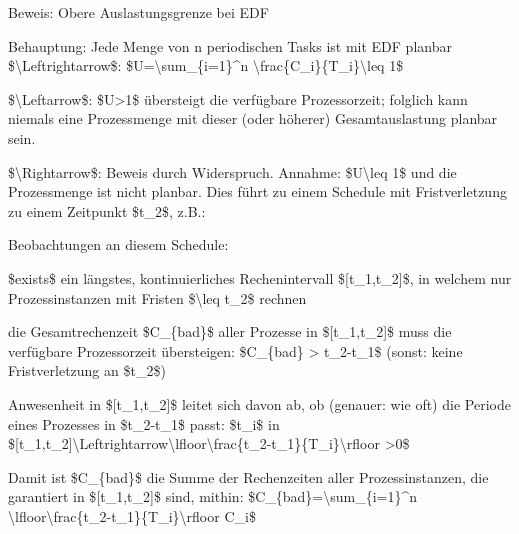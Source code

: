 \documentclass[a4paper]{article}
\begin{document}
\begin{multicols}{3}
\begin{itemize*}
\begin{itemize*}
        \end{itemize*}
        \item Beweis: Obere Auslastungsgrenze bei EDF
        \begin{itemize*}
            \item Behauptung: Jede Menge von n periodischen Tasks ist mit EDF planbar \$\textbackslash Leftrightarrow\$: \$U=\textbackslash sum\_\{i=1\}\^{}n \textbackslash frac\{C\_i\}\{T\_i\}\textbackslash leq 1\$
            \item \$\textbackslash Leftarrow\$: \$U\textgreater1\$ übersteigt die verfügbare Prozessorzeit; folglich kann niemals eine Prozessmenge mit dieser (oder höherer) Gesamtauslastung planbar sein.
            \item \$\textbackslash Rightarrow\$: Beweis durch Widerspruch. Annahme: \$U\textbackslash leq 1\$ und die Prozessmenge ist nicht planbar. Dies führt zu einem Schedule mit Fristverletzung zu einem Zeitpunkt \$t\_2\$, z.B.:
            \item Beobachtungen an diesem Schedule:
            \begin{itemize*}
                \item   \$exists\$ ein längstes, kontinuierliches Rechenintervall   \${[}t\_1,t\_2{]}\$, in welchem nur Prozessinstanzen mit Fristen   \$\textbackslash leq t\_2\$ rechnen
                \item   die Gesamtrechenzeit \$C\_\{bad\}\$ aller Prozesse in   \${[}t\_1,t\_2{]}\$ muss die verfügbare Prozessorzeit übersteigen:   \$C\_\{bad\} \textgreater{} t\_2-t\_1\$ (sonst: keine   Fristverletzung an \$t\_2\$)
                \item   Anwesenheit in \${[}t\_1,t\_2{]}\$ leitet sich davon ab, ob   (genauer: wie oft) die Periode eines Prozesses in \$t\_2-t\_1\$   passt: \$t\_i\$ in   \${[}t\_1,t\_2{]}\textbackslash Leftrightarrow\textbackslash lfloor\textbackslash frac\{t\_2-t\_1\}\{T\_i\}\textbackslash rfloor   \textgreater0\$
                \item   Damit ist \$C\_\{bad\}\$ die Summe der Rechenzeiten aller   Prozessinstanzen, die garantiert in \${[}t\_1,t\_2{]}\$ sind,   mithin: \$C\_\{bad\}=\textbackslash sum\_\{i=1\}\^{}n   \textbackslash lfloor\textbackslash frac\{t\_2-t\_1\}\{T\_i\}\textbackslash rfloor   C\_i\$

\end{itemize*}
\end{itemize*}
\end{itemize*}
\end{multicols}
\end{document}
